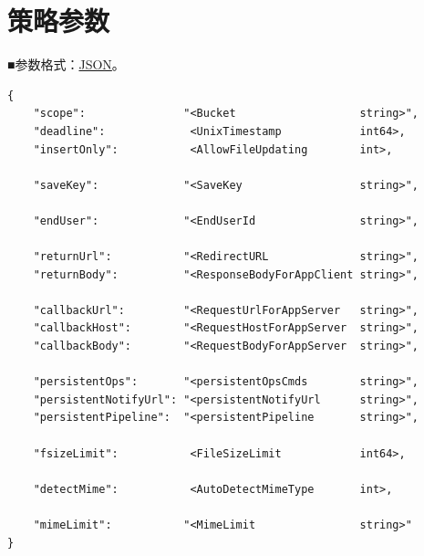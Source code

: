 \documentclass[11pt, oneside]{book}
\newcommand{\qblock}[1]{
\vspace{0.1em}
\noindent
#1\par
\vspace{0.1em}
}
\begin{document}
\section{策略参数}

\qblock{■\thinspace 参数格式：\href{http://zh.wikipedia.org/wiki/JSON}{JSON}。}
\begin{lstlisting}
{
    "scope":               "<Bucket                   string>",
    "deadline":             <UnixTimestamp            int64>,
    "insertOnly":           <AllowFileUpdating        int>,

    "saveKey":             "<SaveKey                  string>",

    "endUser":             "<EndUserId                string>",

    "returnUrl":           "<RedirectURL              string>",
    "returnBody":          "<ResponseBodyForAppClient string>",

    "callbackUrl":         "<RequestUrlForAppServer   string>",
    "callbackHost":        "<RequestHostForAppServer  string>",
    "callbackBody":        "<RequestBodyForAppServer  string>",

    "persistentOps":       "<persistentOpsCmds        string>",
    "persistentNotifyUrl": "<persistentNotifyUrl      string>",
    "persistentPipeline":  "<persistentPipeline		  string>",

    "fsizeLimit":           <FileSizeLimit            int64>,

    "detectMime":           <AutoDetectMimeType       int>,

    "mimeLimit":           "<MimeLimit                string>"
}
\end{lstlisting}

\clearpage
\end{document}

